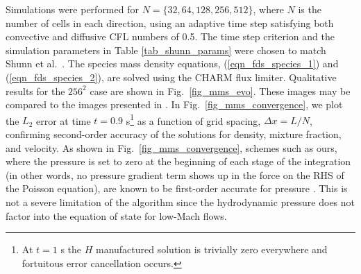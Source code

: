 \documentclass[11pt]{book}
\begin{document}
Simulations were performed for $N = \{32, 64, 128, 256, 512\}$, where $N$ is the number of cells in each direction, using an adaptive time step satisfying both convective and diffusive CFL numbers of 0.5.  The time step criterion and the simulation parameters in Table \ref{tab_shunn_params} were chosen to match Shunn et al.~\cite{Shunn:2012}. The species mass density equations, (\ref{eqn_fds_species_1}) and (\ref{eqn_fds_species_2}), are solved using the CHARM flux limiter. Qualitative results for the $256^2$ case are shown in Fig.~\ref{fig_mms_evo}.  These images may be compared to the images presented in \cite{Shunn:2012}.  In Fig.~\ref{fig_mms_convergence}, we plot the $L_2$ error at time $t = 0.9$ s\footnote{At $t=1$ s the $H$ manufactured solution is trivially zero everywhere and fortuitous error cancellation occurs.} as a function of grid spacing, $\Delta x = L/N$, confirming second-order accuracy of the solutions for density, mixture fraction, and velocity.  As shown in Fig.~\ref{fig_mms_convergence}, schemes such as ours, where the pressure is set to zero at the beginning of each stage of the integration (in other words, no pressure gradient term shows up in the force on the RHS of the Poisson equation), are known to be first-order accurate for pressure \cite{Armfield:2002}. This is not a severe limitation of the algorithm since the hydrodynamic pressure does not factor into the equation of state for low-Mach flows.
\end{document}
